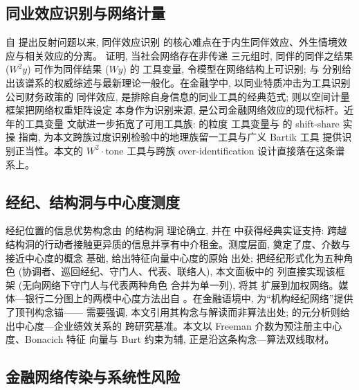\subsection{同业效应识别与网络计量}

自 \textcite{manski1993reflection} 提出反射问题以来, 同伴效应识别
的核心难点在于内生同伴效应、外生情境效应与相关效应的分离。
\textcite{bramoulle2009identification} 证明, 当社会网络存在非传递
三元组时, 同伴的同伴之结果 ($W^{2}y$) 可作为同伴结果 ($Wy$) 的
工具变量, 令模型在网络结构上可识别;
\textcite{bramoulle2020peer} 与 \textcite{boucher2024general}
分别给出该谱系的权威综述与最新理论一般化。在金融学中,
\textcite{leary2014peer} 以同业特质冲击为工具识别公司财务政策的
同伴效应, 是排除自身信息的同业工具的经典范式;
\textcite{grieser2022network} 则以空间计量框架把网络权重矩阵设定
本身作为识别来源, 是公司金融网络效应的现代标杆。近年的工具变量
文献进一步拓宽了可用工具族: \textcite{gabaix2024granular} 的粒度
工具变量与 \textcite{borusyak2025practical} 的 shift-share 实操
指南, 为本文跨族过度识别检验中的地理族留一工具与广义 Bartik 工具
提供识别正当性。本文的 $W^{2}\cdot\text{tone}$ 工具与跨族
over-identification 设计直接落在这条谱系上。

\subsection{经纪、结构洞与中心度测度}

经纪位置的信息优势构念由 \textcite{burt1992structural} 的结构洞
理论确立, 并在 \textcite{burt2004structural} 中获得经典实证支持:
跨越结构洞的行动者接触更异质的信息并享有中介租金。测度层面,
\textcite{freeman1978centrality} 奠定了度、介数与接近中心度的概念
基础, \textcite{bonacich1972factoring} 给出特征向量中心度的原始
出处; \textcite{gould1989structures} 把经纪形式化为五种角色
(协调者、巡回经纪、守门人、代表、联络人), 本文面板中的
 列直接实现该框架 (无向网络下守门人与代表两种角色
合并为单一列), \textcite{zador2022weighted} 将其
扩展到加权网络。媒体—银行二分图上的两模中心度方法出自
\textcite{borgatti1997network}。在金融语境中,
\textcite{han2024brokerage} 为``机构经纪网络''提供了顶刊构念锚——
需要强调, 本文引用其构念与解读而非算法出处;
\textcite{nezami2025network} 的元分析则给出中心度—企业绩效关系的
跨研究基准。本文以 Freeman 介数为预注册主中心度、Bonacich 特征
向量与 Burt 约束为辅, 正是沿这条构念—算法双线取材。

\subsection{金融网络传染与系统性风险}

